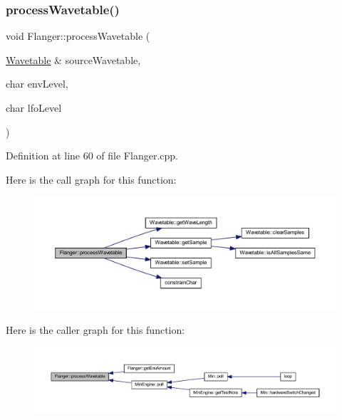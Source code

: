 \subsubsection{\texorpdfstring{process\+Wavetable()}{processWavetable()}}
{\footnotesize\ttfamily void Flanger\+::process\+Wavetable (\begin{DoxyParamCaption}\item[{\hyperlink{class_wavetable}{Wavetable} \&}]{source\+Wavetable,  }\item[{char}]{env\+Level,  }\item[{char}]{lfo\+Level }\end{DoxyParamCaption})}



Definition at line 60 of file Flanger.\+cpp.

Here is the call graph for this function\+:
\nopagebreak
\begin{figure}[H]
\begin{center}
\leavevmode
\includegraphics[width=350pt]{d5/d64/class_flanger_af0c970c914193ea326ca177869f508c1_cgraph}
\end{center}
\end{figure}
Here is the caller graph for this function\+:
\nopagebreak
\begin{figure}[H]
\begin{center}
\leavevmode
\includegraphics[width=350pt]{d5/d64/class_flanger_af0c970c914193ea326ca177869f508c1_icgraph}
\end{center}
\end{figure}
\mbox{\label{class_flanger_a382a9889299da650998fe547dd859c5f}} 
